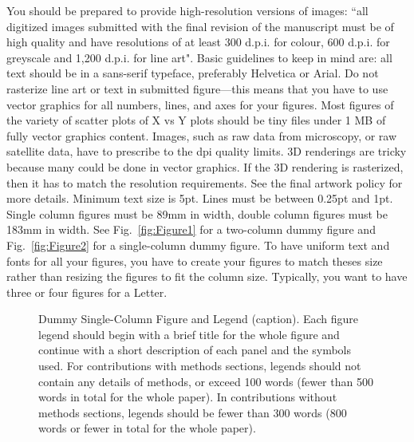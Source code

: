 
% 




You should be prepared to provide high-resolution versions of images: ``all digitized images submitted with the final revision of the manuscript must be of high quality and have resolutions of at least 300 d.p.i. for colour, 600 d.p.i. for greyscale and 1,200 d.p.i. for line art"\cite{nimgpol}. Basic guidelines to keep in mind are: all text should be in a sans-serif typeface, preferably Helvetica or Arial. Do not rasterize line art or text in submitted figure---this means that you have to use vector graphics for all numbers, lines, and axes for your figures. Most figures of the variety of scatter plots of X vs Y plots should be tiny files under 1 MB of fully vector graphics content. Images, such as raw data from microscopy, or raw satellite data, have to prescribe to the dpi quality limits. 3D renderings are tricky because many could be done in vector graphics. If the 3D rendering is rasterized, then it has to match the resolution requirements. See the final artwork policy\cite{nfinalimg} for more details.  Minimum text size is 5pt. Lines must be between 0.25pt and 1pt. Single column figures must be 89mm in width, double column figures must be 183mm in width. See Fig.~\ref{fig:Figure1} for a two-column dummy figure and Fig.~\ref{fig:Figure2} for a single-column dummy figure. To have uniform text and fonts for all your figures, you have to create your figures to match theses size rather than resizing the figures to fit the column size. Typically, you want to have three or four figures for a Letter.


	
\begin{figure}
\centerline{}
\caption{ Dummy Single-Column Figure and Legend (caption). Each figure legend should begin with a brief title for the whole figure and continue with a short description of each panel and the symbols used. For contributions with methods sections, legends should not contain any details of methods, or exceed 100 words (fewer than 500 words in total for the whole paper). In contributions without methods sections, legends should be fewer than 300 words (800 words or fewer in total for the whole paper)\cite{gta}.}
\end{figure}

